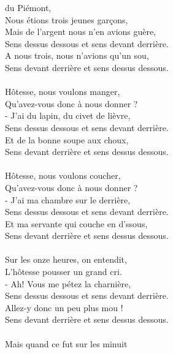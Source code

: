 
 du Piémont,~~~~~~~~~~~~~~~~~\bissimple
\\Nous étions trois jeunes garçons,  ~~~~~~~~~~~~~~~\bissimple
\\Mais de l'argent nous n'en avions guère,
\\Sens dessus dessous et sens devant derrière.
\\A nous trois, nous n'avions qu'un sou,
\\Sens devant derrière et sens dessus dessous. ~~~~~~~~~~~~~~~~~~~\bissimple
\\\\Hôtesse, nous voulons manger,~~~~~~~~~~~~~~~~~\bissimple
\\Qu'avez-vous donc à nous donner ?  ~~~~~~~~~~  \bissimple
\\- J'ai du lapin, du civet de lièvre,
\\Sens dessus dessous et sens devant derrière.
\\Et de la bonne soupe aux choux,
\\Sens devant derrière et sens dessus dessous. \bissimple
\\\\Hôtesse, nous voulons coucher,~~~~~~~~~~~~~~~\bissimple
\\Qu'avez-vous donc à nous donner ?~~~~~~~~~~~~\bissimple
\\- J'ai ma chambre sur le derrière,
\\Sens dessus dessous et sens devant derrière.
\\Et ma servante qui couche en d'ssous,
\\Sens devant derrière et sens dessus dessous. \bissimple
\\\\Sur les onze heures, on entendit,~~~~~~~~~~~~~~~\bissimple
\\L'hôtesse pousser un grand cri. ~~~~~~~~~~~~~~~~\bissimple
\\- Ah! Vous me pétez la charnière,
\\Sens dessus dessous et sens devant derrière.
\\Allez-y donc un peu plus mou !
\\Sens devant derrière et sens dessus dessous. \bissimple
\\\\Mais quand ce fut sur les minuit ~~~~~~~~~~~~~~~\bissimple
